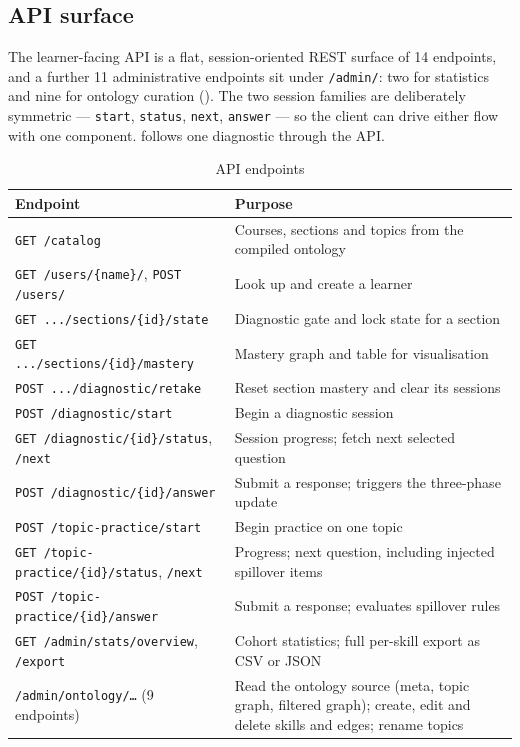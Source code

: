 \subsection{API surface}

The learner-facing API is a flat, session-oriented REST surface of 14 endpoints,
and a further 11 administrative endpoints sit under \texttt{/admin/}: two for
statistics and nine for ontology curation (). The two session
families are deliberately symmetric --- \texttt{start}, \texttt{status},
\texttt{next}, \texttt{answer} --- so the client can drive either flow with one
component.  follows one diagnostic through the API.

\begin{table}[htbp]
  \centering
  \caption{API endpoints}
  \label{tab:api}
  \begin{tabularx}{\textwidth}{>{\hsize}Y>{\hsize}Y}
    \toprule
    Endpoint & Purpose \\
    \midrule
    \texttt{GET /catalog} & Courses, sections and topics from the compiled ontology \\
    \texttt{GET /users/\{name\}/}, \texttt{POST /users/} & Look up and create a learner \\
    \texttt{GET .../sections/\{id\}/state} & Diagnostic gate and lock state for a section \\
    \texttt{GET .../sections/\{id\}/mastery} & Mastery graph and table for visualisation \\
    \texttt{POST .../diagnostic/retake} & Reset section mastery and clear its sessions \\
    \texttt{POST /diagnostic/start} & Begin a diagnostic session \\
    \texttt{GET /diagnostic/\{id\}/status}, \texttt{/next} & Session progress; fetch next selected question \\
    \texttt{POST /diagnostic/\{id\}/answer} & Submit a response; triggers the three-phase update \\
    \texttt{POST /topic-practice/start} & Begin practice on one topic \\
    \texttt{GET /topic-practice/\{id\}/status}, \texttt{/next} & Progress; next question, including injected spillover items \\
    \texttt{POST /topic-practice/\{id\}/answer} & Submit a response; evaluates spillover rules \\
    \midrule
    \texttt{GET /admin/stats/overview}, \texttt{/export} & Cohort statistics; full per-skill export as CSV or JSON \\
    \texttt{/admin/ontology/\dots} (9 endpoints) & Read the ontology source (meta, topic graph, filtered graph); create, edit and delete skills and edges; rename topics \\
    \bottomrule
  \end{tabularx}
\end{table}

